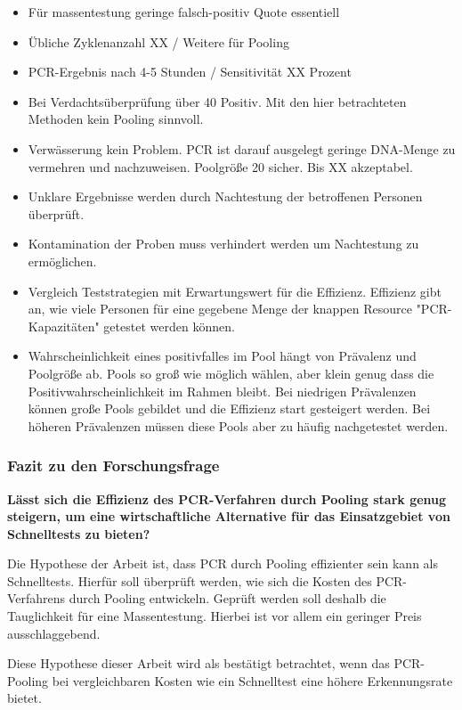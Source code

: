 \begin{itemize}
	\item Für massentestung geringe falsch-positiv Quote essentiell
	\item Übliche Zyklenanzahl XX / Weitere für Pooling
	\item PCR-Ergebnis nach 4-5 Stunden / Sensitivität XX Prozent
	\item Bei Verdachtsüberprüfung über 40 Positiv. Mit den hier betrachteten Methoden kein Pooling sinnvoll.
	\item Verwässerung kein Problem. PCR ist darauf ausgelegt geringe DNA-Menge zu vermehren und nachzuweisen.
	Poolgröße 20 sicher. Bis XX akzeptabel.
	\item Unklare Ergebnisse werden durch Nachtestung der betroffenen Personen überprüft.
	\item Kontamination der Proben muss verhindert werden um Nachtestung zu ermöglichen.
	\item Vergleich Teststrategien mit Erwartungswert für die Effizienz. Effizienz gibt an, wie viele Personen für eine gegebene Menge der knappen Resource "PCR-Kapazitäten" getestet werden können.
	\item Wahrscheinlichkeit eines positivfalles im Pool hängt von Prävalenz und Poolgröße ab. Pools so groß wie möglich wählen, aber klein genug dass die Positivwahrscheinlichkeit im Rahmen bleibt. Bei niedrigen Prävalenzen können große Pools gebildet und die Effizienz start gesteigert werden. Bei höheren Prävalenzen müssen diese Pools aber zu häufig nachgetestet werden.
	

	
\end{itemize}
\cleardoublepage



\subsubsection{Fazit zu den Forschungsfrage}
\textbf{Lässt sich die Effizienz des PCR-Verfahren durch Pooling stark genug steigern, um eine wirtschaftliche Alternative für das Einsatzgebiet von Schnelltests zu bieten?}

Die Hypothese der Arbeit ist, dass PCR durch Pooling effizienter sein kann als Schnelltests.
Hierfür soll überprüft werden, wie sich die Kosten des PCR-Verfahrens durch Pooling entwickeln.
Geprüft werden soll deshalb die Tauglichkeit für eine Massentestung.
Hierbei ist vor allem ein geringer Preis ausschlaggebend.

Diese Hypothese dieser Arbeit wird als bestätigt betrachtet, wenn das PCR-Pooling bei vergleichbaren Kosten wie ein Schnelltest eine höhere Erkennungsrate bietet.

